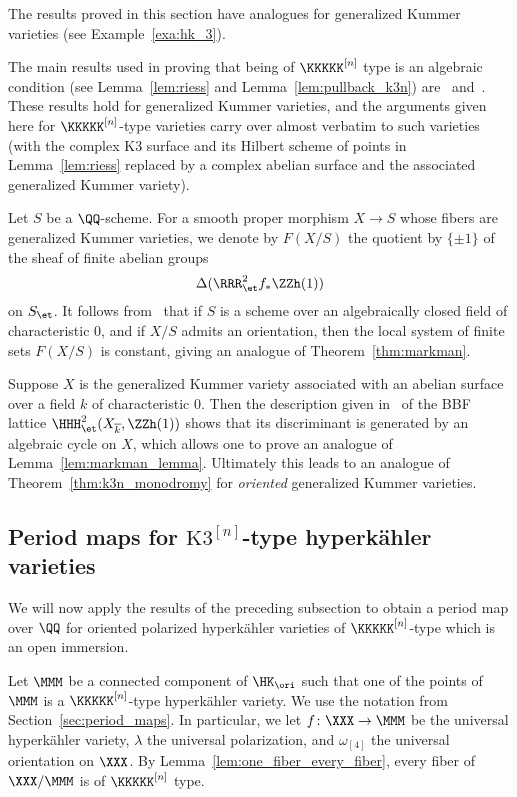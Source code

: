 \begin{remark}\label{rk:kummer_varieties}
The results proved in this section have analogues for generalized Kummer varieties (see Example~\ref{exa:hk_3}). 

The main results used in proving that being of $\KKKKK^{[n]}$ type is an algebraic condition (see Lemma~\ref{lem:riess} and Lemma~\ref{lem:pullback_k3n}) are~\cite[Corollary~1.2]{MongardiPacienza} and~\cite[Proposition~2.1]{Riess}. These results hold for generalized Kummer varieties, and the arguments given here for $\KKKKK^{[n]}$-type varieties carry over almost verbatim to such varieties (with the complex K3 surface and its Hilbert scheme of points in Lemma~\ref{lem:riess} replaced by a complex abelian surface and the associated generalized Kummer variety).

Let $S$ be a $\QQ$-scheme. For a smooth proper morphism $X \rightarrow S$ whose fibers are generalized Kummer varieties, we denote by $F(X/S)$ the quotient by $\{\pm 1\}$ of the sheaf of finite abelian groups
$$
\Delta(\RRR^2_{\et} f_* \ZZh(1))
$$
on $S_{\et}$. It follows from~\cite[Theorem~4.3]{Mongardi} that if $S$ is a scheme over an algebraically closed field of characteristic $0$, and if $X/S$ admits an orientation, then the local system of finite sets $F(X/S)$ is constant, giving an analogue of Theorem~\ref{thm:markman}.

Suppose $X$ is the generalized Kummer variety associated with an abelian surface over a field $k$ of characteristic $0$. Then the description given in~\cite{Beauville} of the BBF lattice $\HHH^2_{\et}(X_{\overline{k}},\ZZh(1))$ shows that its discriminant is generated by an algebraic cycle on $X$, which allows one to prove an analogue of Lemma~\ref{lem:markman_lemma}. Ultimately this leads to an analogue of Theorem~\ref{thm:k3n_monodromy} for \emph{oriented} generalized Kummer varieties.
\end{remark}

\subsection{Period maps for $\text{K3}^{[n]}$-type hyperk\"ahler varieties}
We will now apply the results of the preceding subsection to obtain a period map over $\QQ$ for oriented polarized hyperk\"ahler varieties of $\KKKKK^{[n]}$-type which is an open immersion.

Let $\MMM$ be a connected component of $\HK_{\ori}$ such that one of the points of $\MMM$ is a $\KKKKK^{[n]}$-type hyperk\"ahler variety. We use the notation from Section~\ref{sec:period_maps}. In particular, we let $f\colon \XXX \rightarrow \MMM$ be the universal hyperk\"ahler variety, $\lambda$ the universal polarization, and $\omega_{[4]}$ the universal orientation on $\XXX$. By Lemma~\ref{lem:one_fiber_every_fiber}, every fiber of $\XXX/\MMM$ is of $\KKKKK^{[n]}$ type.

